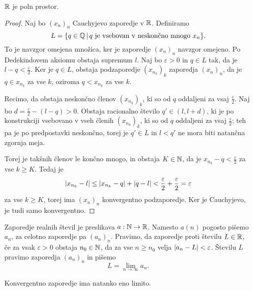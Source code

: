 
\begin{izrek}
  $\mathbb{R}$ je poln prostor.
\end{izrek}

\begin{proof}
  Naj bo $(x_n)_n$ Cauchyjevo zaporedje v $\mathbb{R}$.
  Definiramo
  \[
	L = \{ q \in \mathbb{Q} \,|\, \text{$q$ je vsebovan v neskončno mnogo $x_n$} \}.
  \]
  To je navzgor omejena množica, ker je zaporedje $(x_n)_n$ navzgor omejeno.
  Po Dedekindovem aksiomu obstaja supremum $l$.
  Naj bo $\varepsilon > 0$ in $q \in L$ tak, da je $l - q <
  \frac{\varepsilon}{2}$.
  Ker je $q \in L$, obstaja podzaporedje $(x_{n_k})_k$ zaporedja $(x_n)_n$, da je
  $q \in x_{n_k}$ za vse $k$, oziroma $q < x_{n_k}$ za vse $k$.

  Recimo, da obstaja neskončno členov $(x_{n_k})_k$, ki so od $q$ oddaljeni za
  vsaj $\frac{\varepsilon}{2}$.
  Naj bo $d = \frac{\varepsilon}{2} - (l - q) > 0$.
  Obstaja racionalno število $q' \in (l, l+d)$, ki je po konstrukciji vsebovano
  v vseh členih $(x_{n_k})_k$, ki so od $q$ oddaljeni za vsaj
  $\frac{\varepsilon}{2}$; teh pa je po predpostavki neskončno, torej je $q' \in
  L$ in $l < q'$ ne mora biti natančna zgornja meja.
  \protislovje{}

  Torej je takšnih členov le končno mnogo, in obstaja $K \in \mathbb{N}$, da je $x_{n_k}
  - q < \frac{\varepsilon}{2}$ za vse $k \ge K$.
  Tedaj je
  \[
	\left| x_{n_k} - l \right| \le \left| x_{n_k} - q \right| + \left| q - l \right|
	< \frac{\varepsilon}{2} + \frac{\varepsilon}{2}
	= \varepsilon
  \]
  za vse $k \ge K$, torej ima $(x_n)_n$ konvergentno podzaporedje.
  Ker je Cauchyjevo, je tudi samo konvergentno.
\end{proof}



Zaporedje realnih števil je preslikava $a: \mathbb{N} \to \mathbb{R}$.
Namesto $a(n)$ pogosto pišemo $a_n$, za celotno zaporedje pa $(a_n)_n$.
Pravimo, da zaporedje  proti številu $L \in \mathbb{R}$, če za vsak
$\varepsilon > 0$ obstaja $n_0 \in \mathbb{N}$, da za vse $n \ge n_0$ velja $\left| a_n -
  L \right| < \varepsilon$.
Številu $L$ pravimo  zaporedja $(a_n)_n$ in pišemo
\[
  L = \lim_{n \to \infty} a_n.
\]

\begin{trditev}
  Konvergentno zaporedje ima natanko eno limito.
\end{trditev}


